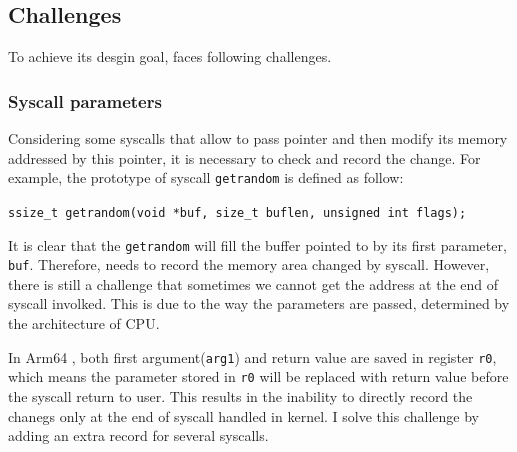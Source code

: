 
\subsection{Challenges}

To achieve its desgin goal, \TheName faces following challenges.


\subsubsection{Syscall parameters}

Considering some syscalls that allow to pass pointer and then modify its memory addressed by this pointer, it is necessary to check and record the change. For example, the prototype of syscall \texttt{getrandom} is defined as follow:\cite{getrandom2}


\centerline{\texttt{ssize\_t getrandom(void *buf, size\_t buflen, unsigned int flags);}}

It is clear that the \texttt{getrandom} will fill the buffer pointed to by its first parameter, \texttt{buf}. Therefore, \TheName needs to record the memory area changed by syscall. However, there is still a challenge that sometimes we cannot get the address at the end of syscall involked. This is due to the way the parameters are passed, determined by the architecture of CPU.

In Arm64 \cite{syscall}, both first argument(\texttt{arg1}) and return value are saved in register \texttt{r0}, which means the parameter stored in \texttt{r0} will be replaced with return value before the syscall return to user. This results in the inability to directly record the chanegs only at the end of syscall handled in kernel. I solve this challenge by adding an extra record for several syscalls.


